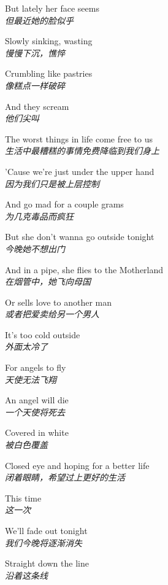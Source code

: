 \begin{spacing}{1.5}
\begin{flushleft}
But lately her face seems\\
\textit{但最近她的脸似乎}\lyricspace

Slowly sinking, wasting\\
\textit{慢慢下沉，憔悴}\lyricspace

Crumbling like pastries\\
\textit{像糕点一样破碎}\lyricspace

And they scream\\
\textit{他们尖叫}\lyricspace

The worst things in life come free to us\\
\textit{生活中最糟糕的事情免费降临到我们身上}\lyricspace

'Cause we're just under the upper hand\\
\textit{因为我们只是被上层控制}\lyricspace

And go mad for a couple grams\\
\textit{为几克毒品而疯狂}\lyricspace

But she don't wanna go outside tonight\\
\textit{今晚她不想出门}\lyricspace

And in a pipe, she flies to the Motherland\\
\textit{在烟管中，她飞向母国}\lyricspace

Or sells love to another man\\
\textit{或者把爱卖给另一个男人}\lyricspace

It's too cold outside\\
\textit{外面太冷了}\lyricspace

For angels to fly\\
\textit{天使无法飞翔}\lyricspace

An angel will die\\
\textit{一个天使将死去}\lyricspace

Covered in white\\
\textit{被白色覆盖}\lyricspace

Closed eye and hoping for a better life\\
\textit{闭着眼睛，希望过上更好的生活}\lyricspace

This time\\
\textit{这一次}\lyricspace

We'll fade out tonight\\
\textit{我们今晚将逐渐消失}\lyricspace

Straight down the line\\
\textit{沿着这条线}\lyricspace


\end{flushleft}
\end{spacing}
